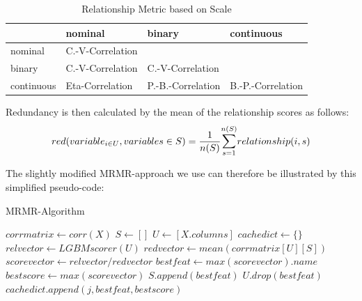 \documentclass[12pt,titlepage]{article}
\begin{document}
\setlength{\tabcolsep}{10pt} %
\renewcommand{\arraystretch}{1.2}
\begin{center}
\begin{table}[H]
    \begin{tabular}{|l|lll|}
    \hline
     & nominal & binary & continuous      \\
    \hline
    nominal                & C.-V-Correlation &         &                 \\
    binary            & C.-V-Correlation & C.-V-Correlation &                 \\
    continuous             & Eta-Correlation & P.-B.-Correlation & B.-P.-Correlation \\
    \hline
    \end{tabular}
    \caption{Relationship Metric based on Scale}
\label{redtable}
\end{table}
\end{center}
\noindent
Redundancy is then calculated by the mean of the relationship scores as follows:
\vspace{5mm}
\noindent
\begin{equation} \label{redundancy}
    red(variable_{i \in U}, variables \in S) = \frac{1}{n(S)} \mathlarger{\sum}_{s=1}^{n(S)} relationship(i, s)
\end{equation}
\vspace{1mm}

\noindent
The slightly modified MRMR-approach we use can therefore be illustrated by this simplified pseudo-code: \\
\begin{algorithm}[H]
\caption{MRMR-Algorithm}\label{alg:mrmr}
\begin{algorithmic}
    \State $corrmatrix \gets corr(X)$
    \State $S \gets \left[ \right]$
    \State $U \gets \left[X.columns\right]$
    \State $cachedict \gets \{\}$
        \State $relvector \gets LGBMscorer(U)$
        \State $redvector \gets mean(corrmatrix\left[U\right]\left[S\right])$
        \State $scorevector \gets relvector/redvector$
        \State $bestfeat \gets max(scorevector).name$
        \State $bestscore \gets max(scorevector)$
        \State $S.append(bestfeat)$
        \State $U.drop(bestfeat)$
        \State $cachedict.append(j,bestfeat, bestscore)$
    \EndFor
\end{algorithmic}
\end{algorithm}
\vspace{1mm}
\end{document}
